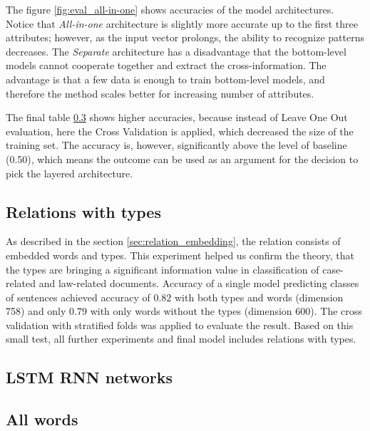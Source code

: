 \documentclass[
  digital, %
  table,   %
  lof,     %
  lot,     %
]{fithesis3}
\begin{document}
The figure \ref{fig:eval_all-in-one} shows accuracies of the model architectures.
Notice that \textit{All-in-one} architecture is slightly more accurate up to the first three attributes; however, as the input vector prolongs, the ability to recognize patterns decreases.
The \textit{Separate} architecture has a disadvantage that the bottom-level models cannot cooperate together and extract the cross-information.
The advantage is that a few data is enough to train bottom-level models, and therefore the method scales better for increasing number of attributes.

The final table \ref{} shows higher accuracies, because instead of Leave One Out evaluation, here the Cross Validation is applied, which decreased the size of the training set. 
The accuracy is, however, significantly above the level of baseline (0.50), which means the outcome can be used as an argument for the decision to pick the layered architecture.

\subsection{Relations with types}
As described in the section \ref{sec:relation_embedding}, the relation consists of embedded words and types.
This experiment helped us confirm the theory, that the types are bringing a significant information value in classification of case-related and law-related documents.
Accuracy of a single model predicting classes of sentences achieved accuracy of $0.82$ with both types and words (dimension 758) and only $0.79$ with only words without the types (dimension 600).
The cross validation with stratified folds was applied to evaluate the result.
Based on this small test, all further experiments and final model includes relations with types.

\subsection{LSTM RNN networks}

\subsection{All words}
\end{document}
